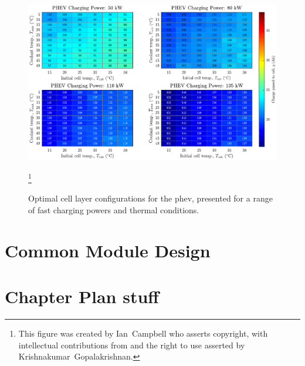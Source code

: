 \begin{figure}[!bp]
    \begin{minipage}[t]{\textwidth}
        \centering
        \includegraphics[width=\textwidth]{fig_generate_heatmap_PHEV}
        \captionsetup{labelsep=note}
        \caption[Optimal cell layer configurations for the \gls{phev}, presented for a range of
        fast charging powers and thermal conditions]{Optimal cell layer configurations for the \gls{phev}, presented for a range of
        fast charging powers and thermal conditions.}
        \label{fig:fig_generate_heatmap_PHEV}
        \mpfootnotes[1]
        \footnote{This figure was created by \mbox{Ian Campbell} who asserts copyright,
            with intellectual contributions from and the right to use asserted by
        \mbox{Krishnakumar Gopalakrishnan}.}
    \end{minipage}
\end{figure}
\section{Common Module Design}\label{sec:commonmodulelayeropt}

\section{Chapter Plan stuff}




